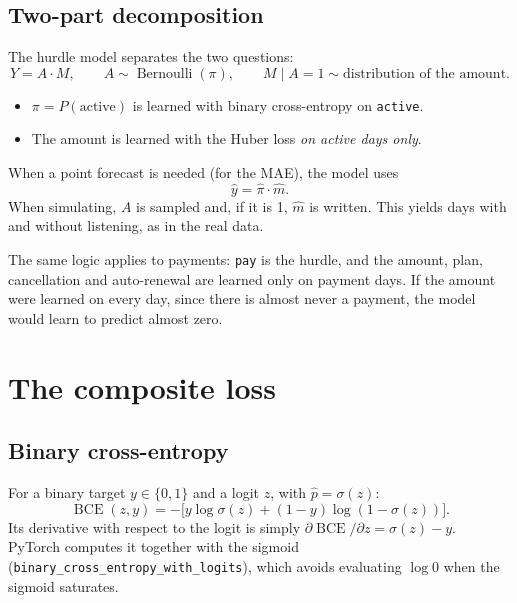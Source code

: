 \documentclass[11pt]{article}
\newcommand{\BCE}{\operatorname{BCE}}
\newcommand{\Bern}{\operatorname{Bernoulli}}
\newcommand{\code}[1]{\texttt{#1}}
\begin{document}
\subsection{Two-part decomposition}

The hurdle model separates the two questions:
\begin{equation}
Y = A \cdot M, \qquad A \sim \Bern(\pi), \qquad M \mid A = 1 \sim \text{distribution of the amount}.
\end{equation}
\begin{itemize}
  \item $\pi = P(\text{active})$ is learned with binary cross-entropy on \code{active}.
  \item The amount is learned with the Huber loss \emph{on active days only}.
\end{itemize}
When a point forecast is needed (for the MAE), the model uses
\begin{equation}
\hat y = \hat\pi \cdot \hat m .
\end{equation}
When simulating, $A$ is sampled and, if it is 1, $\hat m$ is written. This yields days with and without listening, as in the real data.

The same logic applies to payments: \code{pay} is the hurdle, and the amount, plan, cancellation and auto-renewal are learned only on payment days. If the amount were learned on every day, since there is almost never a payment, the model would learn to predict almost zero.

\section{The composite loss}

\subsection{Binary cross-entropy}

For a binary target $y \in \{0, 1\}$ and a logit $z$, with $\hat p = \sigma(z)$:
\begin{equation}
\BCE(z, y) = -\big[y \log \sigma(z) + (1 - y)\log(1 - \sigma(z))\big].
\end{equation}
Its derivative with respect to the logit is simply $\partial \BCE / \partial z = \sigma(z) - y$. PyTorch computes it together with the sigmoid (\code{binary\_cross\_entropy\_with\_logits}), which avoids evaluating $\log 0$ when the sigmoid saturates.
\end{document}

